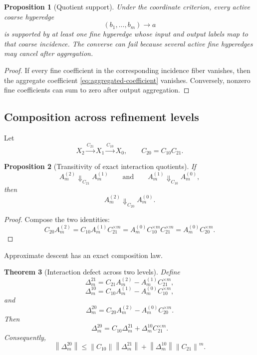 \documentclass[11pt]{article}
\newtheorem{theorem}{Theorem}[section]
\newtheorem{proposition}[theorem]{Proposition}
\theoremstyle{definition}
\theoremstyle{remark}
\newcommand{\norm}[1]{\left\lVert #1\right\rVert}
\begin{document}
\begin{proposition}[Quotient support]\label{prop:quotient-support}
Under the coordinate criterion, every active coarse hyperedge
\[
  (b_1,\ldots,b_m)\longrightarrow a
\]
is supported by at least one fine hyperedge whose input and output labels map to that coarse incidence.  The converse can fail because several active fine hyperedges may cancel after aggregation.
\end{proposition}

\begin{proof}
If every fine coefficient in the corresponding incidence fiber vanishes, then the aggregate coefficient \eqref{eq:aggregated-coefficient} vanishes.  Conversely, nonzero fine coefficients can sum to zero after output aggregation.
\end{proof}

\subsection{Composition across refinement levels}
Let
\[
  X_2\xrightarrow{C_{21}}X_1\xrightarrow{C_{10}}X_0,
  \qquad
  C_{20}=C_{10}C_{21}.
\]

\begin{proposition}[Transitivity of exact interaction quotients]\label{prop:quotient-transitivity}
If
\[
  A_m^{(2)}\Downarrow_{C_{21}}A_m^{(1)}
  \qquad\text{and}\qquad
  A_m^{(1)}\Downarrow_{C_{10}}A_m^{(0)},
\]
then
\[
  A_m^{(2)}\Downarrow_{C_{20}}A_m^{(0)}.
\]
\end{proposition}

\begin{proof}
Compose the two identities:
\[
  C_{20}A_m^{(2)}
  =C_{10}A_m^{(1)}C_{21}^{\times m}
  =A_m^{(0)}C_{10}^{\times m}C_{21}^{\times m}
  =A_m^{(0)}C_{20}^{\times m}.
\]
\end{proof}

Approximate descent has an exact composition law.

\begin{theorem}[Interaction defect across two levels]\label{thm:multilevel-defect}
Define
\[
  \Delta_m^{21}
  =C_{21}A_m^{(2)}-A_m^{(1)}C_{21}^{\times m},
\]
\[
  \Delta_m^{10}
  =C_{10}A_m^{(1)}-A_m^{(0)}C_{10}^{\times m},
\]
and
\[
  \Delta_m^{20}
  =C_{20}A_m^{(2)}-A_m^{(0)}C_{20}^{\times m}.
\]
Then
\begin{equation}\label{eq:multilevel-defect}
  \boxed{
  \Delta_m^{20}
  =
  C_{10}\Delta_m^{21}
  +
  \Delta_m^{10}C_{21}^{\times m}.}
\end{equation}
Consequently,
\begin{equation}\label{eq:multilevel-defect-norm}
  \norm{\Delta_m^{20}}
  \leq
  \norm{C_{10}}\norm{\Delta_m^{21}}
  +
  \norm{\Delta_m^{10}}\norm{C_{21}}^m.
\end{equation}
\end{theorem}
\end{document}
